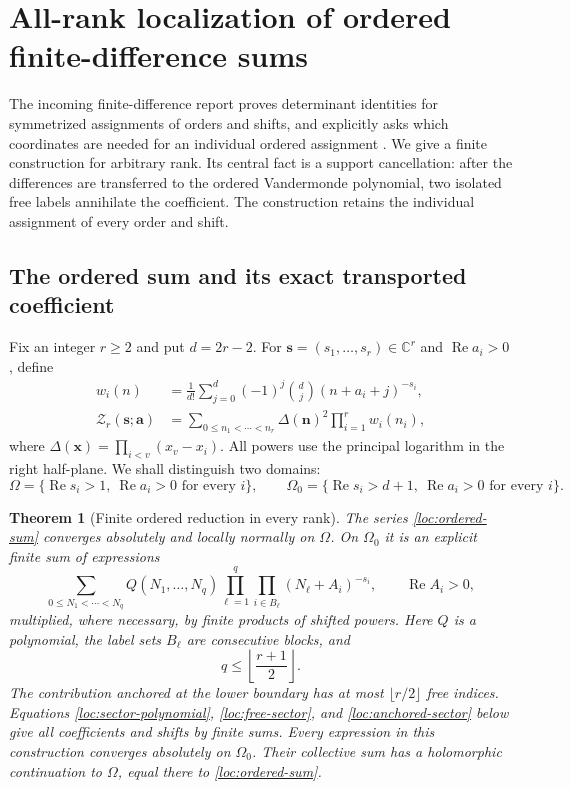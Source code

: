 \documentclass[11pt,a4paper]{article}
\numberwithin{equation}{section}
\newtheorem{theorem}{Theorem}[section]
\theoremstyle{definition}
\theoremstyle{remark}
\newcommand{\C}{\mathbb C}
\newcommand{\Rea}{\operatorname{Re}}
\begin{document}
\section{All-rank localization of ordered finite-difference sums}
\label{sec:localization}

The incoming finite-difference report proves determinant identities for
symmetrized assignments of orders and shifts, and explicitly asks which
coordinates are needed for an individual ordered assignment
\cite[Sections 3 and 9]{repo:finite}.  We give a finite construction for
arbitrary rank.  Its central fact is a support cancellation: after the
differences are transferred to the ordered Vandermonde polynomial, two
isolated free labels annihilate the coefficient.  The construction retains
the individual assignment of every order and shift.

\subsection{The ordered sum and its exact transported coefficient}

Fix an integer $r\ge2$ and put $d=2r-2$.  For
$\mathbf s=(s_1,\ldots,s_r)\in\C^r$ and
$\Rea a_i>0$, define
\begin{align}
 w_i(n)&=\frac1{d!}\sum_{j=0}^{d}(-1)^j\binom dj
                       (n+a_i+j)^{-s_i},
                       \label{loc:weights}\\
 \mathcal Z_r(\mathbf s;\mathbf a)
   &=\sum_{0\le n_1<\cdots<n_r}
          \Delta(\mathbf n)^2\prod_{i=1}^r w_i(n_i),
                       \label{loc:ordered-sum}
\end{align}
where $\Delta(\mathbf x)=\prod_{i<v}(x_v-x_i)$.
All powers use the principal logarithm in the right half-plane.  We shall
distinguish two domains:
\[
 \Omega=\{\Rea s_i>1,\ \Rea a_i>0\text{ for every }i\},
 \qquad
 \Omega_0=\{\Rea s_i>d+1,\ \Rea a_i>0\text{ for every }i\}.
\]

\begin{theorem}[Finite ordered reduction in every rank]
\label{loc:main}
The series \eqref{loc:ordered-sum} converges absolutely and locally normally
on $\Omega$.  On $\Omega_0$ it is an explicit finite sum of expressions
\begin{equation}
 \sum_{0\le N_1<\cdots<N_q}
    Q(N_1,\ldots,N_q)
    \prod_{\ell=1}^q\prod_{i\in B_\ell}
                      (N_\ell+A_i)^{-s_i},
 \qquad \Rea A_i>0,
 \label{loc:reduced-form}
\end{equation}
multiplied, where necessary, by finite products of shifted powers.
Here $Q$ is a polynomial, the label sets $B_\ell$ are consecutive blocks,
and
\[
 q\le\left\lfloor\frac{r+1}{2}\right\rfloor.
\]
The contribution anchored at the lower boundary has at most
$\lfloor r/2\rfloor$ free indices.  Equations
\eqref{loc:sector-polynomial}, \eqref{loc:free-sector}, and
\eqref{loc:anchored-sector} below give all coefficients and shifts by
finite sums.  Every expression in this construction converges absolutely
on $\Omega_0$.  Their collective sum has a holomorphic continuation to
$\Omega$, equal there to \eqref{loc:ordered-sum}.
\end{theorem}
\end{document}
